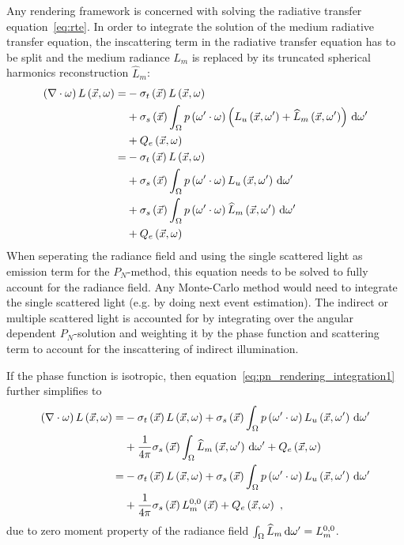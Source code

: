 Any rendering framework is concerned with solving the radiative transfer equation~\ref{eq:rte}. In order to integrate the solution of the medium radiative transfer equation, the inscattering term in the radiative transfer equation has to be split and the medium radiance $L_m$ is replaced by its truncated spherical harmonics reconstruction $\widehat{L}_m$:
\begin{align}
\left(\nabla\cdot\omega\right)L\left(\vec{x}, \omega \right)
=&
-\sigma_t\left(\vec{x}\right) L\left(\vec{x}, \omega \right)\nonumber\\
&
+\sigma_s\left(\vec{x}\right) \int_{\Omega}
{
p\left(\omega'\cdot\omega\right)\left(L_u\left(\vec{x}, \omega' \right)+\widehat{L}_m\left(\vec{x}, \omega' \right)\right)\,\mathrm{d}\omega'
}
\nonumber
\\
&
+Q_e\left(\vec{x}, \omega\right)
\nonumber
\\
=&
-\sigma_t\left(\vec{x}\right) L\left(\vec{x}, \omega \right)
\nonumber\\
&
+\sigma_s\left(\vec{x}\right) \int_{\Omega}
{
p\left(\omega'\cdot\omega\right)L_u\left(\vec{x}, \omega' \right)\,\mathrm{d}\omega'
}
\nonumber\\
&
+\sigma_s\left(\vec{x}\right) \int_{\Omega}
{
p\left(\omega'\cdot\omega\right)\widehat{L}_m\left(\vec{x}, \omega' \right)\,\mathrm{d}\omega'
}
\nonumber\\
&
+Q_e\left(\vec{x}, \omega\right)
\label{eq:pn_rendering_integration1}
\end{align}
When seperating the radiance field and using the single scattered light as emission term for the $P_N$-method, this equation needs to be solved to fully account for the radiance field. Any Monte-Carlo method would need to integrate the single scattered light (e.g. by doing next event estimation). The indirect or multiple scattered light is accounted for by integrating over the angular dependent $P_N$-solution and weighting it by the phase function and scattering term to account for the inscattering of indirect illumination.

If the phase function is isotropic, then equation~\ref{eq:pn_rendering_integration1} further simplifies to
\begin{align}
\left(\nabla\cdot\omega\right)L\left(\vec{x}, \omega \right)
=&
-\sigma_t\left(\vec{x}\right) L\left(\vec{x}, \omega \right)
+\sigma_s\left(\vec{x}\right) \int_{\Omega}
{
p\left(\omega'\cdot\omega\right)L_u\left(\vec{x}, \omega' \right)\,\mathrm{d}\omega'
}
\nonumber\\
&
+
\frac{1}{4\pi}
\sigma_s\left(\vec{x}\right)
\int_{\Omega}
{
\widehat{L}_m\left(\vec{x}, \omega' \right)\,\mathrm{d}\omega'
}
+Q_e\left(\vec{x}, \omega\right)
\nonumber\\
=&
-\sigma_t\left(\vec{x}\right) L\left(\vec{x}, \omega \right)
+\sigma_s\left(\vec{x}\right) \int_{\Omega}
{
p\left(\omega'\cdot\omega\right)L_u\left(\vec{x}, \omega' \right)\,\mathrm{d}\omega'
}
\nonumber\\
&
+
\frac{1}{4\pi}
\sigma_s\left(\vec{x}\right)
L_m^{0,0}\left(\vec{x}\right)
+Q_e\left(\vec{x}, \omega\right)
\ ,
\label{eq:pn_rendering_integration2}
\end{align}
due to zero moment property of the radiance field $\int_{\Omega}\widehat{L}_m\,\mathrm{d}\omega'=L_m^{0,0}$.

